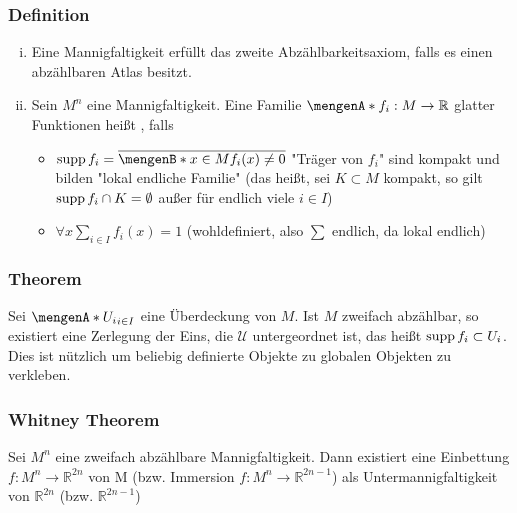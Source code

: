 \subsubsection{Definition}
\label{ssub:135}
\begin{enumerate}[(i)]
	\item Eine Mannigfaltigkeit erfüllt das zweite Abzählbarkeitsaxiom, falls es einen abzählbaren Atlas besitzt.
	\item Sein $M^n$ eine Mannigfaltigkeit. Eine Familie $\set{f_i:M\to \mathds{R}}$ glatter Funktionen heißt , falls
	\begin{itemize}
		\item $\supp f_i = \overline{\set[x\in M]{f_i(x) \neq 0}}$ "Träger von $f_i$" sind kompakt und bilden "lokal endliche Familie" (das heißt, sei $K\subset M$ kompakt, so gilt $\operatorname{supp} f_i \cap K = \emptyset$ außer für endlich viele $i\in I$)
		\item $\forall x \sum_{i\in I} f_i(x) = 1$ (wohldefiniert, also $\sum$ endlich, da lokal endlich)
	\end{itemize}
\end{enumerate}

\subsubsection{Theorem}
\label{ssub:136}
Sei $\set{U_i}_{i\in I}$ eine Überdeckung von $M$. Ist $M$ zweifach abzählbar, so existiert eine Zerlegung der Eins, die $\mathcal{U}$ untergeordnet ist, das heißt $\operatorname{supp} f_i \subset U_i$. Dies ist nützlich um beliebig definierte Objekte zu globalen Objekten zu verkleben.

\subsubsection{Whitney Theorem}
\label{ssub:137}
Sei $M^n$ eine zweifach abzählbare Mannigfaltigkeit. Dann existiert eine Einbettung $f:M^n\to \mathds{R}^{2n}$ von M (bzw. Immersion $f:M^n\to \mathds{R}^{2n-1}$) als Untermannigfaltigkeit von $\mathds{R}^{2n}$ (bzw. $\mathds{R}^{2n-1}$)

